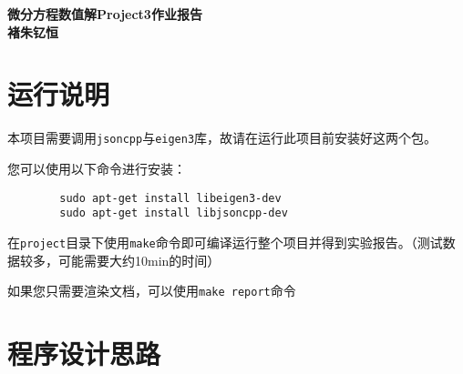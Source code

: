 \documentclass[12]{article}%
\begin{document}
\begin{center}
    \LARGE\songti\textbf{微分方程数值解Project3作业报告} \\%
    \large\kaishu\textbf{褚朱钇恒}%
\end{center}
\section{运行说明}
    本项目需要调用\verb|jsoncpp|与\verb|eigen3|库，故请在运行此项目前安装好这两个包。
    
    您可以使用以下命令进行安装：

    \begin{lstlisting}
        sudo apt-get install libeigen3-dev
        sudo apt-get install libjsoncpp-dev
    \end{lstlisting}

    在\verb|project|目录下使用\verb|make|命令即可编译运行整个项目并得到实验报告。（测试数据较多，可能需要大约10min的时间）

    如果您只需要渲染文档，可以使用\verb|make report|命令

\section{程序设计思路}
\end{document}

